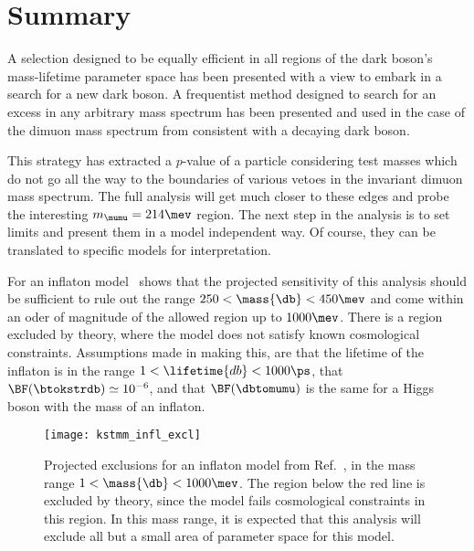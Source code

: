 \section{Summary}

A selection designed to be equally efficient in all regions of the dark boson's mass-lifetime
parameter space has been presented with a view to embark in a search for a new dark boson.
A frequentist method designed to search for an excess in any arbitrary mass spectrum has been
presented and used in the case of the dimuon mass spectrum from \btokstrmumu consistent with a
decaying dark boson.

This strategy has extracted a $p$-value of a particle considering test masses which do not go all
the way to the boundaries of various vetoes in the invariant dimuon mass spectrum.
The full analysis will get much closer to these edges and probe the interesting $m_{\mumu}=214\mev$
region.
The next step in the analysis is to set limits and present them in a model independent way.
Of course, they can be translated to specific models for interpretation.


For an inflaton model~\cite{Bezrukov:2014nza}
 shows that the projected
sensitivity of this analysis should be sufficient to rule out the range
$250<\mass{\db}<450\mev$ and come within an oder of magnitude of the allowed region up to
$1000\mev$.
There is a region excluded by theory, where the model does not satisfy known cosmological
constraints.
Assumptions made in making this, are that the lifetime of the inflaton is in the range
$1<\lifetime{db}<1000\ps$, that  $\BF(\btokstrdb)\simeq10^{-6}$, and that $\BF(\dbtomumu)$
is the same for a Higgs boson with the mass of an inflaton.

\begin{figure}
  \begin{center}
    \texttt{[image: kstmm\_infl\_excl]}
    \caption[Projected sensitivity in an inflaton search]
    {
      Projected exclusions for an inflaton model from Ref.~\protect\cite{Bezrukov:2014nza}, in the
      mass range $1<\mass{\db}<1000\mev$.
      The region below the red line is excluded by theory, since the model fails cosmological
      constraints in this region.
      In this mass range, it is expected that this analysis will exclude all but a small area of
      parameter space for this model.
    }
    \label{fig:db:excl:infl}
  \end{center}
\end{figure}

